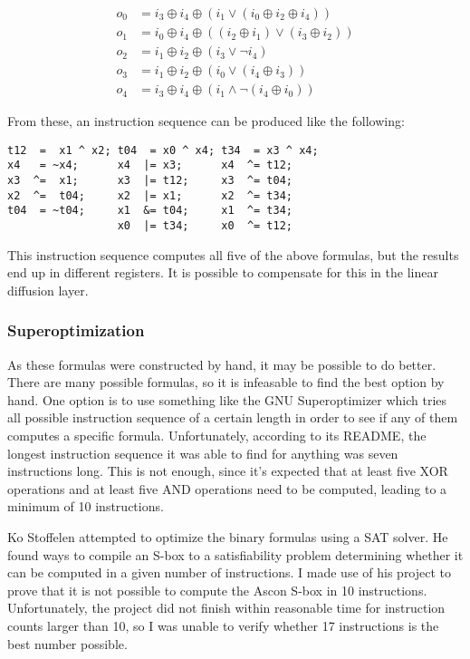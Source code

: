 \begin{samepage}
\begin{align*}
   o_0 & = i_3 \oplus i_4 \oplus (i_1 \vee (i_0 \oplus i_2 \oplus i_4))
\\ o_1 & = i_0 \oplus i_4 \oplus ((i_2 \oplus i_1) \vee (i_3 \oplus i_2))
\\ o_2 & = i_1 \oplus i_2 \oplus (i_3 \vee \neg i_4)
\\ o_3 & = i_1 \oplus i_2 \oplus (i_0 \vee (i_4 \oplus i_3))
\\ o_4 & = i_3 \oplus i_4 \oplus (i_1 \wedge \neg (i_4 \oplus i_0))
\end{align*}
\end{samepage}

From these, an instruction sequence can be produced like the following:

\begin{samepage}
\begin{verbatim}
t12  =  x1 ^ x2; t04  = x0 ^ x4; t34  = x3 ^ x4;
x4   = ~x4;      x4  |= x3;      x4  ^= t12;
x3  ^=  x1;      x3  |= t12;     x3  ^= t04;
x2  ^=  t04;     x2  |= x1;      x2  ^= t34;
t04  = ~t04;     x1  &= t04;     x1  ^= t34;
                 x0  |= t34;     x0  ^= t12;
\end{verbatim}
\end{samepage}

This instruction sequence computes all five of the above formulas, but the
results end up in different registers. It is possible to compensate for this in
the linear diffusion layer.

\subsubsection{Superoptimization}

As these formulas were constructed by hand, it may be possible to do better.
There are many possible formulas, so it is infeasable to find the best option by
hand. One option is to use something like the GNU Superoptimizer which tries all
possible instruction sequence of a certain length in order to see if any of them
computes a specific formula. Unfortunately, according to its README, the longest
instruction sequence it was able to find for anything was seven instructions
long. This is not enough, since it's expected that at least five XOR operations
and at least five AND operations need to be computed, leading to a minimum of 10
instructions.

Ko Stoffelen\cite{sat} attempted to optimize the binary formulas using a SAT
solver. He found ways to compile an S-box to a satisfiability problem
determining whether it can be computed in a given number of instructions. I made
use of his project to prove that it is not possible to compute the Ascon S-box
in 10 instructions. Unfortunately, the project did not finish within reasonable
time for instruction counts larger than 10, so I was unable to verify whether 17
instructions is the best number possible.

